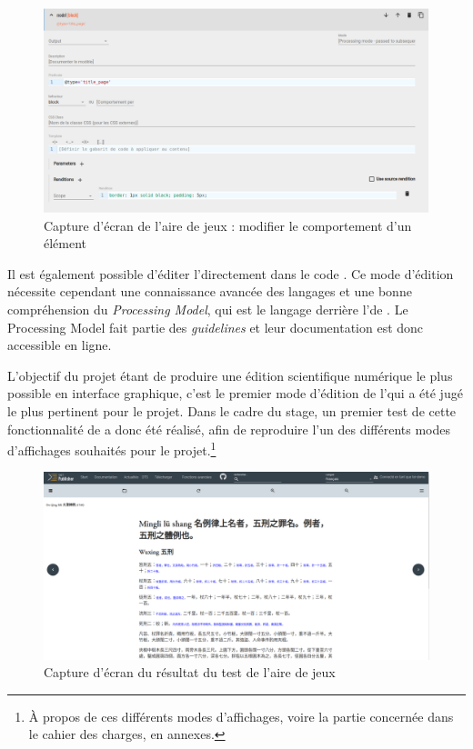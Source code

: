 \begin{figure}
    \centering
    \includegraphics[width=\textwidth]{images/odd_playground.png}
    \caption{Capture d'écran de l'aire de jeux \tp : modifier le comportement d'un élément}
\end{figure}

Il est également possible d'éditer l'\ODD directement dans le code \XML. Ce mode d'édition nécessite cependant une connaissance avancée des langages \XML et une bonne compréhension du \textit{\TEI Processing Model}, qui est le langage derrière l'\ODD de \tp. Le \TEI Processing Model fait partie des \textit{guidelines} \TEI et leur documentation est donc accessible en ligne. 

L'objectif du projet \COREL étant de produire une édition scientifique numérique le plus possible en interface graphique, c'est le premier mode d'édition de l'\ODD qui a été jugé le plus pertinent pour le projet. Dans le cadre du stage, un premier test de cette fonctionnalité de \tp a donc été réalisé, afin de reproduire l'un des différents modes d'affichages souhaités pour le projet.\footnote{À propos de ces différents modes d'affichages, voire la partie concernée dans le cahier des charges, en annexes.} 

\begin{figure}[h]
    \centering
    \includegraphics[width=\textwidth]{images/tei_publisher_test.png}
    \caption{Capture d'écran du résultat du test de l'aire de jeux}
\end{figure}


